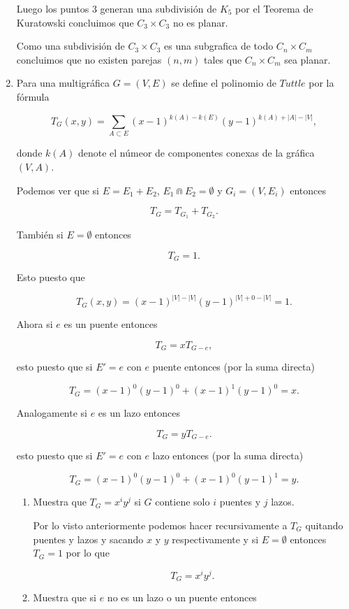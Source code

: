 \documentclass[letterpaper]{article}
\newcommand{\pars}[1]{\left( #1 \right) }
\newcommand{\1}{\mathbbm{1}}
\begin{document}
\begin{enumerate}
		Luego los puntos $3$ generan una subdivisión de $K_5$ por el Teorema de Kuratowski concluimos que $C_3\times C_3$ no es planar.

		Como una subdivisión de $C_3\times C_3$ es una subgrafica de todo $C_n\times C_m$ concluimos que no existen parejas $(n,m)$ tales que $C_n\times C_m$ sea planar.

		\item Para una multigráfica $G = (V,E)$ se define el polinomio de $Tuttle$ por la fórmula
		
		\[T_G(x,y) = \sum_{A\subset E} \pars{x-1}^{k(A) - k(E)} \pars{y-1}^{k(A)+|A|-|V|},\]

		donde $k(A)$ denote el númeor de componentes conexas de la gráfica $(V,A)$.

		Podemos ver que si $E = E_1 + E_2$, $E_1\Cap E_2 = \emptyset$ y $G_i = (V,E_i)$ entonces 
			
		\[T_G = T_{G_1} + T_{G_2}.\]

		También si $E = \emptyset$ entonces
			
		\[T_G = 1.\]

		Esto puesto que

		\[T_G(x,y) = (x-1)^{|V|-|V|}(y-1)^{|V|+0-|V|} = 1.\]
			
		Ahora si $e$ es un puente entonces
			
		\[T_{G} = xT_{G-e},\]

		esto puesto que si $E' = {e}$ con $e$ puente entonces (por la suma directa)

		\[T_G = (x-1)^0(y-1)^0 + (x-1)^1(y-1)^0 = x.\]

		Analogamente si $e$ es un lazo entonces
			
		\[T_{G} = yT_{G-e}.\]

		esto puesto que si $E' = {e}$ con $e$ lazo entonces (por la suma directa)

		\[T_G = (x-1)^0(y-1)^0 + (x-1)^0(y-1)^1 = y.\]

		\begin{enumerate}
			\item Muestra que $T_G=x^iy^j$ si $G$ contiene solo $i$ puentes y $j$ lazos.
			
			Por lo visto anteriormente podemos hacer recursivamente a $T_G$ quitando puentes y lazos y sacando $x$ y $y$ respectivamente y si $E=\emptyset$ entonces $T_G=1$ por lo que 

			\[T_G=x^iy^j.\]
			
			\item Muestra que si $e$ no es un lazo o un puente entonces
			

\end{enumerate}
\end{enumerate}
\end{document}
